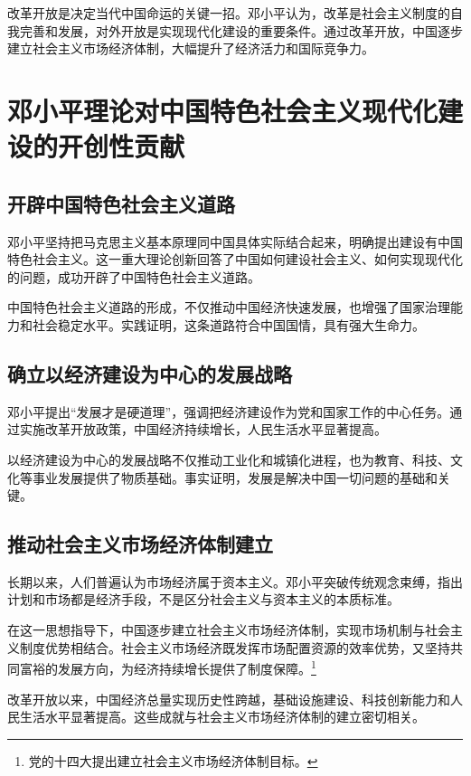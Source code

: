 \documentclass[12pt,a4paper]{article}
\begin{document}
改革开放是决定当代中国命运的关键一招。邓小平认为，改革是社会主义制度的自我完善和发展，对外开放是实现现代化建设的重要条件。通过改革开放，中国逐步建立社会主义市场经济体制，大幅提升了经济活力和国际竞争力。

\section{邓小平理论对中国特色社会主义现代化建设的开创性贡献}

\subsection{开辟中国特色社会主义道路}

邓小平坚持把马克思主义基本原理同中国具体实际结合起来，明确提出建设有中国特色社会主义。这一重大理论创新回答了中国如何建设社会主义、如何实现现代化的问题，成功开辟了中国特色社会主义道路。

中国特色社会主义道路的形成，不仅推动中国经济快速发展，也增强了国家治理能力和社会稳定水平。实践证明，这条道路符合中国国情，具有强大生命力。

\subsection{确立以经济建设为中心的发展战略}

邓小平提出“发展才是硬道理”，强调把经济建设作为党和国家工作的中心任务。通过实施改革开放政策，中国经济持续增长，人民生活水平显著提高。

以经济建设为中心的发展战略不仅推动工业化和城镇化进程，也为教育、科技、文化等事业发展提供了物质基础。事实证明，发展是解决中国一切问题的基础和关键。

\subsection{推动社会主义市场经济体制建立}

长期以来，人们普遍认为市场经济属于资本主义。邓小平突破传统观念束缚，指出计划和市场都是经济手段，不是区分社会主义与资本主义的本质标准。

在这一思想指导下，中国逐步建立社会主义市场经济体制，实现市场机制与社会主义制度优势相结合。社会主义市场经济既发挥市场配置资源的效率优势，又坚持共同富裕的发展方向，为经济持续增长提供了制度保障。\footnote{党的十四大提出建立社会主义市场经济体制目标。}

改革开放以来，中国经济总量实现历史性跨越，基础设施建设、科技创新能力和人民生活水平显著提高。这些成就与社会主义市场经济体制的建立密切相关。
\end{document}
